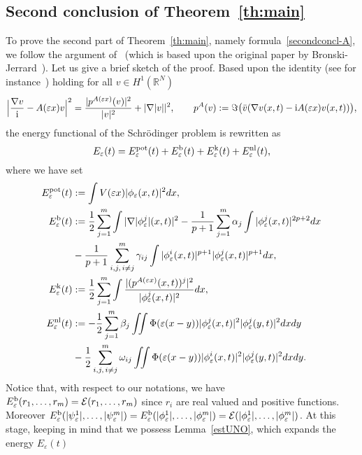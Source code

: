\documentclass[11pt]{amsart}
\numberwithin{equation}{section}
\theoremstyle{definition}
\begin{document}
\subsection{Second conclusion of Theorem~\ref{th:main}}
To prove the second part of Theorem~\ref{th:main}, namely formula~\eqref{secondconcl-A},
we follow the argument of~\cite{selvit} (which is based upon the original
paper by Bronski-Jerrard~\cite{bronski}). Let us give a brief sketch of the proof.
Based upon the identity (see for instance~\cite[p.2571]{selvit}) holding for all $v\in H^1({{\mathbb R}}^N)$
$$
\Big|\frac{\nabla v}{{\rm i}}-A({\varepsilon} x)v\Big|^2=\frac{|p^{A({\varepsilon} x)}(v)|^2}{|v|^2}+|\nabla |v||^2,
\qquad
p^A(v):={{\Im}}\big(\bar v(\nabla v(x,t)-{{\rm i}} A({\varepsilon} x)v(x,t))\big),
$$
the energy functional of the Schr\"odinger problem is rewritten as
$$
E_{\varepsilon}(t)=E_{\varepsilon}^{{\rm pot}}(t)+E_{\varepsilon}^{{\rm b}}(t)+E_{\varepsilon}^{{\rm k}}(t)+E_{\varepsilon}^{{\rm nl}}(t),
$$
where we have set
\begin{align*}
E_{\varepsilon}^{{\rm pot}}(t)&:=	\int V({\varepsilon} x)|\phi_{\varepsilon}(x,t)|^2dx,    \\
E_{\varepsilon}^{{\rm b}}(t) &:=\frac{1}{2}\sum_{j=1}^m\int 	|\nabla |\phi_{\varepsilon}^j|(x,t)|^2
-\frac{1}{p+1}\sum_{j=1}^m\alpha_j\int |\phi_{\varepsilon}^j(x,t)|^{2p+2}dx \\
& -\frac{1}{p+1}\sum_{i,j,\,i\neq j}^m \gamma_{ij}\int |\phi_{\varepsilon}^i(x,t)|^{p+1}|\phi_{\varepsilon}^j(x,t)|^{p+1}dx , \\
E_{\varepsilon}^{{\rm k}}(t) &:=	\frac{1}{2}\sum_{j=1}^m\int \frac{|(p^{A({\varepsilon} x)}(x,t))^j|^2}{|\phi_{\varepsilon}^j(x,t)|^2}dx, \\
E_{\varepsilon}^{{\rm nl}}(t) &:=-\frac{1}{2}\sum_{j=1}^m\beta_j \iint \Phi({\varepsilon}(x-y))|\phi_{\varepsilon}^j(x,t)|^2|\phi_{\varepsilon}^j(y,t)|^2 dx dy \\
 &-\frac{1}{2}\sum_{i,j,\,i\neq j}^m\omega_{ij} \iint \Phi({\varepsilon}(x-y))|\phi_{\varepsilon}^i(x,t)|^2|\phi_{\varepsilon}^j(y,t)|^2 dx dy.	
\end{align*}
Notice that, with respect to our notations, we have $E_{\varepsilon}^{{\rm b}}(r_1,\dots,r_m)={\mathcal E}(r_1,\dots,r_m)$
since $r_i$ are real valued and positive functions. Moreover
$E_{\varepsilon}^{{\rm b}}(|\psi_{\varepsilon}^1|,\dots,|\psi_{\varepsilon}^m|)=E_{\varepsilon}^{{\rm b}}(|\phi_{\varepsilon}^1|,\dots,|\phi_{\varepsilon}^m|)={\mathcal E}(|\phi_{\varepsilon}^1|,\dots,|\phi_{\varepsilon}^m|)$.
At this stage, keeping in mind that we possess Lemma~\ref{estUNO}, which expands the energy $E_{\varepsilon}(t)$
\end{document}
